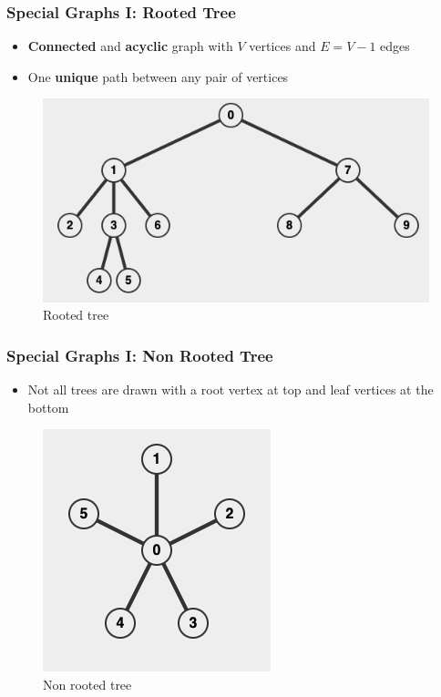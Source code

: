 \documentclass{beamer}
\begin{document}
\begin{frame}
\frametitle{Special Graphs I: Rooted Tree}
	\begin{itemize}
	    \item \textbf{Connected} and \textbf{acyclic} graph with $V$ vertices and $E = V-1$ edges
	    \item One \textbf{unique} path between any pair of vertices
	\end{itemize}
	\begin{figure}
	    \centering
	    \includegraphics[scale=0.3]{imgs/2.4/graph/tree-one.png}
	    \caption{Rooted tree}
	\end{figure}
\end{frame}

\begin{frame}
\frametitle{Special Graphs I: Non Rooted Tree}
	\begin{itemize}
	    \item Not all trees are drawn with a root vertex at top and leaf vertices at the bottom
	\end{itemize}
	\begin{figure}
	    \centering
	    \includegraphics[scale=0.4]{imgs/2.4/graph/tree-two.png}
	    \caption{Non rooted tree}
	\end{figure}
\end{frame}
\end{document}
